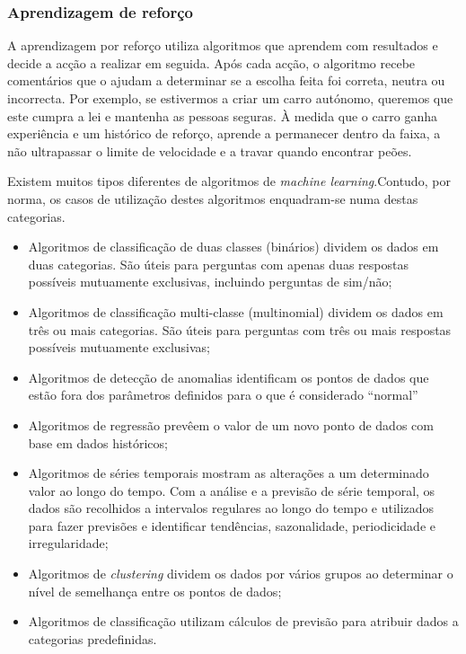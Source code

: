 \subsubsection{Aprendizagem de reforço}

A aprendizagem por reforço utiliza algoritmos que aprendem com resultados e decide a acção a realizar em seguida.
Após cada acção, o algoritmo recebe comentários que o ajudam a determinar se a escolha feita foi correta, neutra ou incorrecta.
Por exemplo, se estivermos a criar um carro autónomo, queremos que este cumpra a lei e mantenha as pessoas seguras.
À medida que o carro ganha experiência e um histórico de reforço, aprende a permanecer dentro da faixa, a não ultrapassar o limite de velocidade e a travar quando encontrar peões.

Existem muitos tipos diferentes de algoritmos de \textit{machine learning}.Contudo, por norma, os casos de utilização destes algoritmos enquadram-se numa destas categorias.
\begin{itemize}
  \setlength\itemsep{0.05em}
  \item Algoritmos de classificação de duas classes (binários) dividem os dados em duas categorias. São úteis para perguntas com apenas duas respostas possíveis mutuamente exclusivas, incluindo perguntas de sim/não;
  \item Algoritmos de classificação multi-classe (multinomial) dividem os dados em três ou mais categorias. São úteis para perguntas com três ou mais respostas possíveis mutuamente exclusivas;
  \item Algoritmos de detecção de anomalias identificam os pontos de dados que estão fora dos parâmetros definidos para o que é considerado ``normal''
  \item Algoritmos de regressão prevêem o valor de um novo ponto de dados com base em dados históricos;
  \item Algoritmos de séries temporais mostram as alterações a um determinado valor ao longo do tempo. Com a análise e a previsão de série temporal, os dados são recolhidos a intervalos regulares ao longo do tempo e utilizados para fazer previsões e identificar tendências, sazonalidade, periodicidade e irregularidade;
  \item Algoritmos de \textit{clustering} dividem os dados por vários grupos ao determinar o nível de semelhança entre os pontos de dados;
  \item Algoritmos de classificação utilizam cálculos de previsão para atribuir dados a categorias predefinidas.
\end{itemize}

